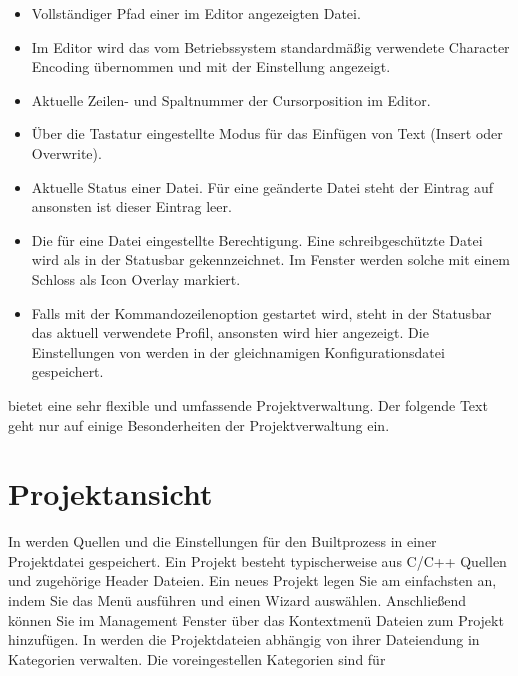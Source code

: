 \begin{itemize}
\item Vollständiger Pfad einer im Editor angezeigten Datei.
\item Im Editor wird das vom Betriebssystem standardmäßig verwendete Character Encoding übernommen und mit der Einstellung  angezeigt.
\item Aktuelle Zeilen- und Spaltnummer der Cursorposition im Editor.
\item Über die Tastatur eingestellte Modus für das Einfügen von Text (Insert oder Overwrite).
\item Aktuelle Status einer Datei. Für eine geänderte Datei steht der Eintrag auf  ansonsten ist dieser Eintrag leer.
\item Die für eine Datei eingestellte Berechtigung. Eine schreibgeschützte Datei wird als  in der Statusbar gekennzeichnet. Im Fenster  werden solche mit einem Schloss als Icon Overlay markiert.


\item Falls \codeblocks mit der Kommandozeilenoption  gestartet wird, steht in der Statusbar das aktuell verwendete Profil, ansonsten wird hier  angezeigt. Die Einstellungen von \codeblocks werden in der gleichnamigen Konfigurationsdatei  gespeichert.
\end{itemize}

\codeblocks bietet eine sehr flexible und umfassende Projektverwaltung. Der folgende Text geht nur auf einige Besonderheiten der Projektverwaltung ein.

\section{Projektansicht}\label{sec:categories}

In \codeblocks werden Quellen und die Einstellungen für den Builtprozess in einer Projektdatei  gespeichert. Ein Projekt besteht typischerweise aus C/C++ Quellen und zugehörige Header Dateien. Ein neues Projekt legen Sie am einfachsten an, indem Sie das Menü  ausführen und einen Wizard auswählen. Anschließend können Sie im Management Fenster über das Kontextmenü  Dateien zum Projekt hinzufügen. In \codeblocks werden die Projektdateien abhängig von ihrer Dateiendung in Kategorien verwalten. Die voreingestellen Kategorien sind für


